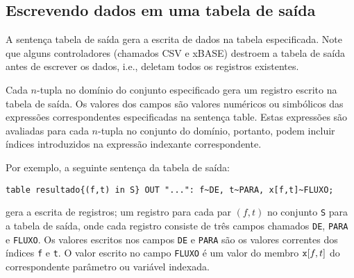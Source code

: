 \documentclass[11pt, brazil]{report}
\begin{document}
\subsection{Escrevendo dados em uma tabela de saída}

A sentença tabela de saída gera a escrita de dados na tabela especificada.
Note que alguns controladores (chamados CSV e xBASE) destroem a tabela de saída
antes de escrever os dados, i.e., deletam todos os registros existentes.

Cada $n$-tupla no domínio do conjunto especificado gera um registro escrito na
tabela de saída. Os valores dos campos são valores numéricos ou simbólicos
das expressões correspondentes especificadas na sentença table. Estas
expressões são avaliadas para cada $n$-tupla no conjunto do domínio,
portanto, podem incluir índices introduzidos na expressão indexante correspondente.

Por exemplo, a seguinte sentença da tabela de saída:

\noindent\hfil
\verb|table resultado{(f,t) in S} OUT "...": f~DE, t~PARA, x[f,t]~FLUXO;|

\noindent
gera a escrita de registros; um registro para cada par $(f,t)$ no conjunto
{\tt S} para a tabela de saída, onde cada registro consiste de três campos
chamados {\tt DE}, {\tt PARA} e {\tt FLUXO}. Os valores escritos nos campos
{\tt DE} e {\tt PARA} são os valores correntes dos índices {\tt f} e {\tt t}.
O valor escrito no campo {\tt FLUXO} é um valor do membro ${\tt x}[f,t]$
do correspondente parâmetro ou variável indexada.


%
%
%
%
\end{document}
